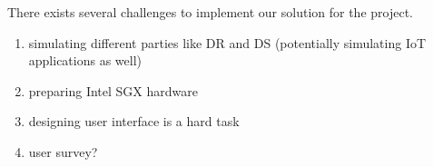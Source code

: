 There exists several challenges to implement our solution for the project.

\begin{enumerate}
\item simulating different parties like DR and DS (potentially simulating IoT applications as well)
\item preparing Intel SGX hardware
\item designing user interface is a hard task
\item user survey?
\end{enumerate}